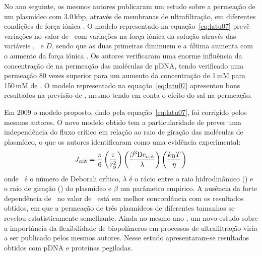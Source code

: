 No ano seguinte, os mesmos autores publicaram um estudo sobre a permeação de um plasmídeo com 3.0\,kbp, através de membranas de ultrafiltração, em diferentes condições de força iónica \cite{latusalt}. O modelo representado na equação~\ref{eq:latu07} prevê variações no valor de \fluxocritico\ com variações na força iónica da solução através das variáveis \raiogiracao, \raiosuperhelice\ e $D$, sendo que as duas primeiras diminuem e a última aumenta com o aumento da força iónica \cite{latusalt}. Os autores verificaram uma enorme influência da concentração de  na permeação das moléculas de pDNA, tendo verificado uma permeação 80 vezes superior para um aumento da concentração de 1\,mM para 150\,mM de . O modelo representado na equação~\ref{eq:latu07} apresentou bons resultados na previsão de \fluxocritico, mesmo tendo em conta o efeito do sal na permeação. 

Em 2009 \cite{latu09} o modelo proposto, dado pela equação~\ref{eq:latu07}, foi corrigido pelos mesmos autores. O novo modelo obtido tem a particularidade de prever uma independência do fluxo crítico em relação ao raio de giração das moléculas de plasmídeo, o que os autores identificaram como uma evidência experimental:
\begin{equation}
\label{eq:latu09}
J_{\mathrm{crit}}=\frac{\pi}{6}\left(\frac{\varepsilon}{r_{\mathrm{p}}^{2}}\right)\left(\frac{\beta^{3}\mathrm{De}_{\mathrm{crit}}}{\lambda}\right)\left(\frac{k_{\mathrm{B}} T}{\eta}\right)
\end{equation}
onde \deborahcritico\ é o número de Deborah crítico, $\lambda$ é o rácio entre o raio hidrodinâmico (\raiostokes) e o raio de giração (\raiogiracao) do plasmídeo e $\beta$ um parâmetro empírico. A ausência da forte dependência de \raiogiracao\ no valor de \fluxocritico\ está em melhor concordância com os resultados obtidos, em que a permeação de três plasmídeos de diferentes tamanhos se revelou estatisticamente semelhante. Ainda no mesmo ano \cite{latuiecr}, um novo estudo sobre a importância da flexibilidade de biopolímeros em processos de ultrafiltração viria a ser publicado pelos mesmos autores. Nesse estudo apresentaram-se resultados obtidos com pDNA e proteínas pegiladas.

